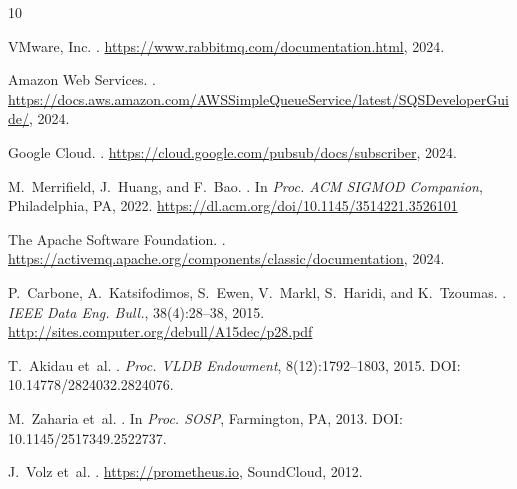 \documentclass[journal]{IEEEtran}
\begin{document}
\begin{thebibliography}{10}

VMware, Inc.
.
\newblock \url{https://www.rabbitmq.com/documentation.html}, 2024.

Amazon Web Services.
.
\newblock \url{https://docs.aws.amazon.com/AWSSimpleQueueService/latest/SQSDeveloperGuide/}, 2024.

Google Cloud.
.
\newblock \url{https://cloud.google.com/pubsub/docs/subscriber}, 2024.

M.~Merrifield, J.~Huang, and F.~Bao.
.
\newblock In \emph{Proc. ACM SIGMOD Companion}, Philadelphia, PA, 2022.
\newblock \url{https://dl.acm.org/doi/10.1145/3514221.3526101}

The Apache Software Foundation.
.
\newblock \url{https://activemq.apache.org/components/classic/documentation}, 2024.


P.~Carbone, A.~Katsifodimos, S.~Ewen, V.~Markl, S.~Haridi, and K.~Tzoumas.
.
\newblock \emph{IEEE Data Eng. Bull.}, 38(4):28--38, 2015.
\newblock \url{http://sites.computer.org/debull/A15dec/p28.pdf}

T.~Akidau et~al.
.
\newblock \emph{Proc. VLDB Endowment}, 8(12):1792--1803, 2015.
\newblock DOI: 10.14778/2824032.2824076.

M.~Zaharia et~al.
.
\newblock In \emph{Proc. SOSP}, Farmington, PA, 2013.
\newblock DOI: 10.1145/2517349.2522737.


J.~Volz et~al.
.
\newblock \url{https://prometheus.io}, SoundCloud, 2012.


\end{thebibliography}
\end{document}
